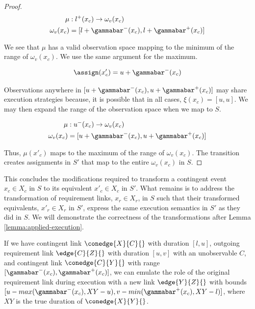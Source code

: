 \documentclass[11pt]{article}
\begin{document}
\begin{proof}
\begin{align*}
\mu &: l^+(x_{c}) \rightarrow \omega_{v}(x_{c}) \\
\omega_{v}(x_{c}) &= [l + \gammabar^{-}(x_{c}), l + \gammabar^+(x_{c})]
\end{align*}

We see that \(\mu\) has a valid observation space mapping to the minimum of the range of
\(\omega_{v}(x_{c})\). We use the same argument for the maximum.

$$
\assign(x'_{c}) = u + \gammabar^-(x_{c})
$$

Observations anywhere in \([u + \gammabar^-(x_{c}), u + \gammabar^+(x_{c})]\) may share execution
strategies because, it is possible that in all cases, \(\xi(x_{c}) = [u, u]\). We may then expand the
range of the observation space when we map to \(S\).

\begin{align*}
\mu &: u^-(x_{c}) \rightarrow \omega_{v}(x_{c}) \\
\omega_{v}(x_{c}) &= [u + \gammabar^{-}(x_{c}), u + \gammabar^+(x_{c})]
\end{align*}

Thus, \(\mu(x'_{c})\) maps to the maximum of the range of \(\omega_{v}(x_{c})\). The transition creates
assignments in \(S'\) that map to the entire \(\omega_{v}(x_{c})\) in \(S\).

\end{proof}

This concludes the modifications required to transform a contingent event \(x_{c} \in X_{c}\) in \(S\)
to its equivalent \(x'_{c} \in X_{c}\) in \(S'\). What remains is to address the transformation of
requirement links, \(x_{r} \in X_{r}\), in \(S\) such that their transformed equivalents, \(x'_{r} \in
X_{r}\) in \(S'\), express the same execution semantics in \(S'\) as they did in \(S\). We will demonstrate
the correctness of the transformations after Lemma \ref{lemma:applied-execution}.

\begin{lemma}
\label{lemma:execution}
If we have contingent link \(\conedge{X}{C}{}\) with duration \([l, u]\), outgoing requirement link
\(\edge{C}{Z}{}\) with duration \([u, v]\) with an unobservable \(C\), and contingent link
\(\conedge{C}{Y}{}\) with range \([\gammabar^-(x_{c}), \gammabar^+(x_{c})]\), we can emulate the role of
the original requirement link during execution with a new link \(\edge{Y}{Z}{}\) with bounds \([u -
max(\gammabar^-(x_{c}), XY - u), v - min(\gammabar^+(x_{c}), XY - l)]\), where \(XY\) is the true
duration of \(\conedge{X}{Y}{}\).
\end{lemma}
\end{document}
